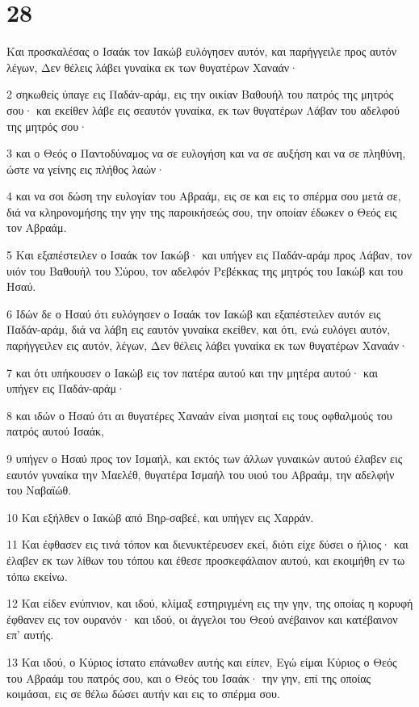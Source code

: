 \chapter{28}

\par Και προσκαλέσας ο Ισαάκ τον Ιακώβ ευλόγησεν αυτόν, και παρήγγειλε προς αυτόν λέγων, Δεν θέλεις λάβει γυναίκα εκ των θυγατέρων Χαναάν·
\par 2 σηκωθείς ύπαγε εις Παδάν-αράμ, εις την οικίαν Βαθουήλ του πατρός της μητρός σου· και εκείθεν λάβε εις σεαυτόν γυναίκα, εκ των θυγατέρων Λάβαν του αδελφού της μητρός σου·
\par 3 και ο Θεός ο Παντοδύναμος να σε ευλογήση και να σε αυξήση και να σε πληθύνη, ώστε να γείνης εις πλήθος λαών·
\par 4 και να σοι δώση την ευλογίαν του Αβραάμ, εις σε και εις το σπέρμα σου μετά σε, διά να κληρονομήσης την γην της παροικήσεώς σου, την οποίαν έδωκεν ο Θεός εις τον Αβραάμ.
\par 5 Και εξαπέστειλεν ο Ισαάκ τον Ιακώβ· και υπήγεν εις Παδάν-αράμ προς Λάβαν, τον υιόν του Βαθουήλ του Σύρου, τον αδελφόν Ρεβέκκας της μητρός του Ιακώβ και του Ησαύ.
\par 6 Ιδών δε ο Ησαύ ότι ευλόγησεν ο Ισαάκ τον Ιακώβ και εξαπέστειλεν αυτόν εις Παδάν-αράμ, διά να λάβη εις εαυτόν γυναίκα εκείθεν, και ότι, ενώ ευλόγει αυτόν, παρήγγειλεν εις αυτόν, λέγων, Δεν θέλεις λάβει γυναίκα εκ των θυγατέρων Χαναάν·
\par 7 και ότι υπήκουσεν ο Ιακώβ εις τον πατέρα αυτού και την μητέρα αυτού· και υπήγεν εις Παδάν-αράμ·
\par 8 και ιδών ο Ησαύ ότι αι θυγατέρες Χαναάν είναι μισηταί εις τους οφθαλμούς του πατρός αυτού Ισαάκ,
\par 9 υπήγεν ο Ησαύ προς τον Ισμαήλ, και εκτός των άλλων γυναικών αυτού έλαβεν εις εαυτόν γυναίκα την Μαελέθ, θυγατέρα Ισμαήλ του υιού του Αβραάμ, την αδελφήν του Ναβαϊώθ.
\par 10 Και εξήλθεν ο Ιακώβ από Βηρ-σαβεέ, και υπήγεν εις Χαρράν.
\par 11 Και έφθασεν εις τινά τόπον και διενυκτέρευσεν εκεί, διότι είχε δύσει ο ήλιος· και έλαβεν εκ των λίθων του τόπου και έθεσε προσκεφάλαιον αυτού, και εκοιμήθη εν τω τόπω εκείνω.
\par 12 Και είδεν ενύπνιον, και ιδού, κλίμαξ εστηριγμένη εις την γην, της οποίας η κορυφή έφθανεν εις τον ουρανόν· και ιδού, οι άγγελοι του Θεού ανέβαινον και κατέβαινον επ' αυτής.
\par 13 Και ιδού, ο Κύριος ίστατο επάνωθεν αυτής και είπεν, Εγώ είμαι Κύριος ο Θεός του Αβραάμ του πατρός σου, και ο Θεός του Ισαάκ· την γην, επί της οποίας κοιμάσαι, εις σε θέλω δώσει αυτήν και εις το σπέρμα σου.
